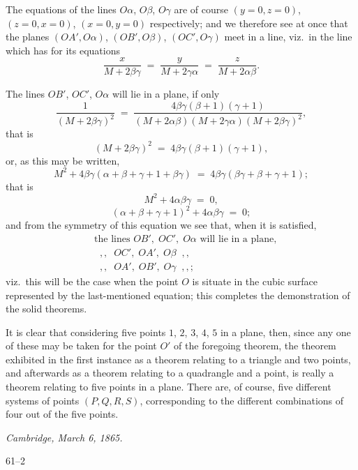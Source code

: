 \documentclass[11pt]{article}
\begin{document}
The equations of the lines $O\alpha$, $O\beta$, $O\gamma$ are of course $(y=0, z=0)$, $(z=0, x=0)$, $(x=0, y=0)$ respectively; and we therefore see at once that the planes $(OA', O\alpha)$, $(OB', O\beta)$, $(OC', O\gamma)$ meet in a line, viz.\ in the line which has for its equations
\[
\frac{x}{M + 2\beta\gamma} \;=\; \frac{y}{M + 2\gamma\alpha} \;=\; \frac{z}{M + 2\alpha\beta}.
\]

The lines $OB'$, $OC'$, $O\alpha$ will lie in a plane, if only
\[
\frac{1}{(M + 2\beta\gamma)^{2}} \;=\; \frac{4\beta\gamma(\beta + 1)(\gamma + 1)}{(M + 2\alpha\beta)(M + 2\gamma\alpha)(M + 2\beta\gamma)^{2}},
\]
that is
\[
(M + 2\beta\gamma)^{2} \;=\; 4\beta\gamma(\beta + 1)(\gamma + 1),
\]
or, as this may be written,
\[
M^{2} + 4\beta\gamma(\alpha + \beta + \gamma + 1 + \beta\gamma) \;=\; 4\beta\gamma(\beta\gamma + \beta + \gamma + 1);
\]
that is
\[
M^{2} + 4\alpha\beta\gamma \;=\; 0,
\]
\[
(\alpha + \beta + \gamma + 1)^{2} + 4\alpha\beta\gamma \;=\; 0;
\]
and from the symmetry of this equation we see that, when it is satisfied,
\begin{align*}
& \text{the lines } OB',\; OC',\; O\alpha \text{ will lie in a plane,}\\
& \;\; ,, \;\; OC',\; OA',\; O\beta \;\; ,,\\
& \;\; ,, \;\; OA',\; OB',\; O\gamma \;\; ,,;
\end{align*}
viz.\ this will be the case when the point $O$ is situate in the cubic surface represented by the last-mentioned equation; this completes the demonstration of the solid theorems.

It is clear that considering five points $1$, $2$, $3$, $4$, $5$ in a plane, then, since any one of these may be taken for the point $O'$ of the foregoing theorem, the theorem exhibited in the first instance as a theorem relating to a triangle and two points, and afterwards as a theorem relating to a quadrangle and a point, is really a theorem relating to five points in a plane. There are, of course, five different systems of points $(P, Q, R, S)$, corresponding to the different combinations of four out of the five points.

\medskip
\noindent\textit{Cambridge, March 6, 1865.}

\hfill 61--2

\newpage

\end{document}
